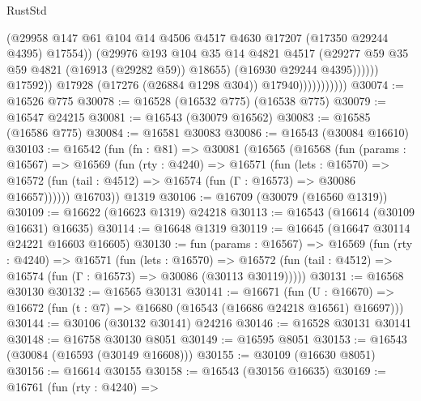 \begin{lexlean}{RustStd}
\begin{coremodule}
                                        (@29958
                                          @147
                                          @61
                                          @104
                                          @14
                                          @4506
                                          @4517
                                          @4630
                                          @17207
                                          (@17350 @29244 @4395)
                                          @17554))
                                      (@29976
                                        @193
                                        @104
                                        @35
                                        @14
                                        @4821
                                        @4517
                                        (@29277 @59 @35 @59 @4821 (@16913 (@29282 @59)) @18655)
                                        (@16930 @29244 @4395))))))
                              @17592))
                          @17928
                          (@17276 (@26884 @1298 @304))
                          @17940)))))))))))
@30074 := @16526 @775
@30078 := @16528 (@16532 @775) (@16538 @775)
@30079 := @16547 @24215
@30081 := @16543 (@30079 @16562)
@30083 := @16585 (@16586 @775)
@30084 := @16581 @30083
@30086 := @16543 (@30084 @16610)
@30103 := @16542
    (fun (fn : @81) =>
    @30081
      (@16565
        (@16568
          (fun (params : @16567) =>
          @16569
            (fun (rty : @4240) =>
            @16571
              (fun (lets : @16570) =>
              @16572 (fun (tail : @4512) => @16574 (fun (Γ : @16573) => @30086 @16657))))))
        @16703))
    @1319
@30106 := @16709 (@30079 (@16560 @1319))
@30109 := @16622 (@16623 @1319) @24218
@30113 := @16543 (@16614 (@30109 @16631) @16635)
@30114 := @16648 @1319
@30119 := @16645 (@16647 @30114 @24221 @16603 @16605)
@30130 := fun (params : @16567) =>
  @16569
    (fun (rty : @4240) =>
    @16571
      (fun (lets : @16570) =>
      @16572 (fun (tail : @4512) => @16574 (fun (Γ : @16573) => @30086 (@30113 @30119)))))
@30131 := @16568 @30130
@30132 := @16565 @30131
@30141 := @16671
    (fun (U : @16670) => @16672 (fun (t : @7) => @16680 (@16543 (@16686 @24218 @16561) @16697)))
@30144 := @30106 (@30132 @30141) @24216
@30146 := @16528 @30131 @30141
@30148 := @16758 @30130 @8051
@30149 := @16595 @8051
@30153 := @16543 (@30084 (@16593 (@30149 @16608)))
@30155 := @30109 (@16630 @8051)
@30156 := @16614 @30155
@30158 := @16543 (@30156 @16635)
@30169 := @16761
    (fun (rty : @4240) =>

\end{coremodule}
\end{lexlean}
